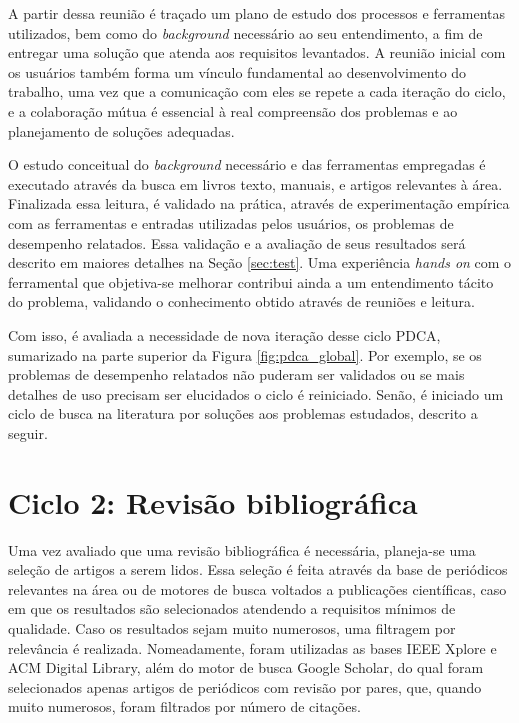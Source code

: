 \documentclass[cic,tc]{iiufrgs}
\begin{document}
A partir dessa reunião é traçado um plano de estudo dos processos e ferramentas
utilizados, bem como do \textit{background} necessário ao seu entendimento, a
fim de entregar uma solução que atenda aos requisitos levantados. A reunião
inicial com os usuários também forma um vínculo fundamental ao desenvolvimento
do trabalho, uma vez que a comunicação com eles se repete a cada iteração do
ciclo, e a colaboração mútua é essencial à real compreensão dos problemas e ao
planejamento de soluções adequadas.

O estudo conceitual do \textit{background} necessário e das ferramentas
empregadas é executado através da busca em livros texto, manuais, e artigos
relevantes à área. Finalizada essa leitura, é validado na prática, através de
experimentação empírica com as ferramentas e entradas utilizadas pelos
usuários, os problemas de desempenho relatados. Essa validação e a avaliação de
seus resultados será descrito em maiores detalhes na Seção \ref{sec:test}. Uma
experiência \textit{hands on} com o ferramental que objetiva-se melhorar
contribui ainda a um entendimento tácito do problema, validando o conhecimento
obtido através de reuniões e leitura. 

Com isso, é avaliada a necessidade de nova iteração desse ciclo PDCA,
sumarizado na parte superior da Figura \ref{fig:pdca_global}. Por exemplo, se
os problemas de desempenho relatados não puderam ser validados ou se mais
detalhes de uso precisam ser elucidados o ciclo é reiniciado. Senão, é iniciado
um ciclo de busca na literatura por soluções aos problemas estudados, descrito
a seguir.

\section{Ciclo 2: Revisão bibliográfica}
\label{sec:lit}

Uma vez avaliado que uma revisão bibliográfica é necessária, planeja-se uma
seleção de artigos a serem lidos. Essa seleção é feita através da base de
periódicos relevantes na área ou de motores de busca voltados a publicações
científicas, caso em que os resultados são selecionados atendendo a requisitos
mínimos de qualidade. Caso os resultados sejam muito numerosos, uma filtragem
por relevância é realizada. Nomeadamente, foram utilizadas as bases IEEE Xplore
e ACM Digital Library, além do motor de busca Google Scholar, do qual foram
selecionados apenas artigos de periódicos com revisão por pares, que, quando
muito numerosos, foram filtrados por número de citações.
\end{document}

